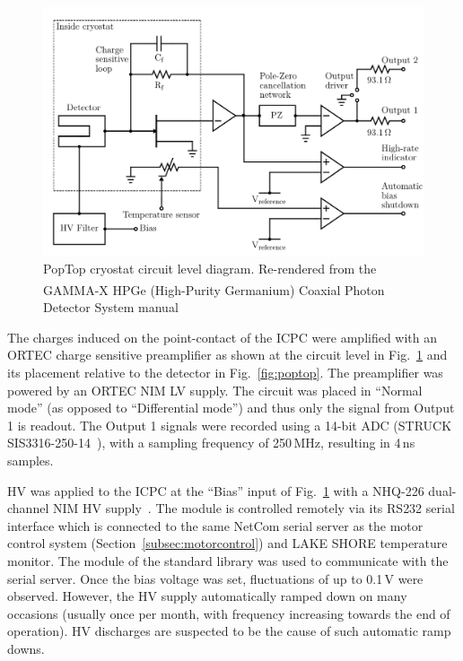 \begin{figure}[htb]
    \centering
    \includegraphics[width=6in]{figs/integration/poptop_circuit_width_6_9in.pdf}
    \caption{PopTop cryostat circuit level diagram. Re-rendered from the GAMMA-X\textsuperscript{\tiny\textregistered} HPGe (High-Purity Germanium) Coaxial Photon Detector System manual~\cite{poptopmanual}}
    \label{fig:poptop_cicuit}
\end{figure}


The charges induced on the point-contact of the ICPC were amplified with an ORTEC charge sensitive preamplifier as shown at the circuit level in Fig.~\ref{fig:poptop_cicuit} and its placement relative to the detector in Fig.~\ref{fig:poptop}. The preamplifier was powered by an ORTEC NIM LV supply. The circuit was placed in ``Normal mode'' (as opposed to ``Differential mode'') and thus only the signal from Output 1 is readout.  The Output 1 signals were recorded using a 14-bit ADC (STRUCK SIS3316-250-14~\cite{STRUCK}), with a sampling frequency of 250\,MHz, resulting in 4\,ns samples.

HV was applied to the ICPC at the ``Bias'' input of Fig.~\ref{fig:poptop_cicuit} with a NHQ-226 dual-channel NIM HV supply~\cite{hvsupply}. The module is controlled remotely via its RS232 serial interface which is connected to the same NetCom serial server as the motor control system (Section~\ref{subsec:motorcontrol}) and LAKE SHORE temperature monitor. The  module of the standard \julia{} library was used to communicate with the serial server. Once the bias voltage was set, fluctuations of up to 0.1\,V were observed. However, the HV supply automatically ramped down on many occasions (usually once per month, with frequency increasing towards the end of operation). HV discharges are suspected to be the cause of such automatic ramp downs.

